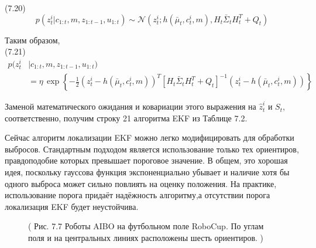\documentclass[10pt,a4paper]{article}
\begin{document}
(7.20)
$$p(z_t^i|c_{1:t},m,z_{1:t-1},u_{1:t})\sim\mathcal{N}(z_t^i;h(\bar{\mu}_t,c_t^i,m),H_t\bar{\varSigma}_tH_t^T+Q_t)$$

Таким образом,\\

(7.21)
\begin{equation*}
\begin{split}
p(z_t^i&|c_{1:t},m,z_{1:t-1},u_{1:t})\\
&=\eta\,\exp\left\lbrace -\frac{1}{2}(z_t^i-h(\bar{\mu}_t,c_t^i,m))^T[H_t\bar{\varSigma}_tH_t^T+Q_t]^{-1}(z_t^i-h(\bar{\mu}_t,c_t^i,m))\right\rbrace 
\end{split}
\end{equation*}

Заменой математического ожидания и ковариации этого выражения на $\hat{z}_t^i$ и $S_t$, соответственно, получим строку 21 алгоритма EKF из Таблице 7.2.

Сейчас алгоритм локализации EKF можно легко модифицировать для обработки выбросов. Стандартным подходом является использование только тех ориентиров, правдоподобие которых превышает пороговое значение. В общем, это хорошая идея, поскольку гауссова функция экспоненциально убывает и наличие хотя бы одного выброса может сильно повлиять на оценку положения. На практике, использование порога придаёт надёжность алгоритму,а отсутствии порога локализация EKF будет неустойчива.\\

\begin{figure}[H]
	\caption{ (  Рис. 7.7 Роботы AIBO на футбольном поле RoboCup. По углам поля и на центральных линиях расположены шесть ориентиров. )}
	\label{fig:77orig}
\end{figure}
\end{document}
